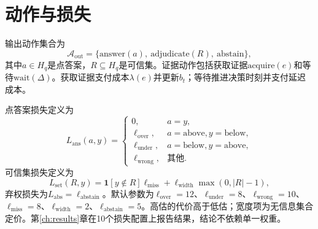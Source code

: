 \documentclass[12pt,openany]{ctexbook}
\newcommand{\indic}{\mathbf{1}}
\begin{document}
\section{动作与损失}
输出动作集合为
\begin{equation}
\mathcal{A}_{\text{out}}=\{\text{answer}(a),\ \text{adjudicate}(R),\ \text{abstain}\},
\end{equation}
其中$a\in H_q$是点答案，$R\subseteq H_q$是可信集。证据动作包括获取证据$\text{acquire}(e)$和等待$\text{wait}(\Delta)$。获取证据支付成本$\lambda(e)$并更新$b_t$；等待推进决策时刻并支付延迟成本。\par
点答案损失定义为
\begin{equation}
L_{\text{ans}}(a,y)=
\begin{cases}
0, & a=y,\\
\ell_{\text{over}}, & a=\text{above}, y=\text{below},\\
\ell_{\text{under}}, & a=\text{below}, y=\text{above},\\
\ell_{\text{wrong}}, & \text{其他}.
\end{cases}
\end{equation}
可信集损失定义为
\begin{equation}
L_{\text{set}}(R,y)=\indic[y\notin R]\ell_{\text{miss}}+\ell_{\text{width}}\max(0,|R|-1),
\end{equation}
弃权损失为$L_{\text{abs}}=\ell_{\text{abstain}}$。默认参数为$\ell_{\text{over}}=12$、$\ell_{\text{under}}=8$、$\ell_{\text{wrong}}=10$、$\ell_{\text{miss}}=8$、$\ell_{\text{width}}=2$、$\ell_{\text{abstain}}=5$。高估的代价高于低估；宽度项为无信息集合定价。第\ref{ch:results}章在10个损失配置上报告结果，结论不依赖单一权重。\par
\end{document}
